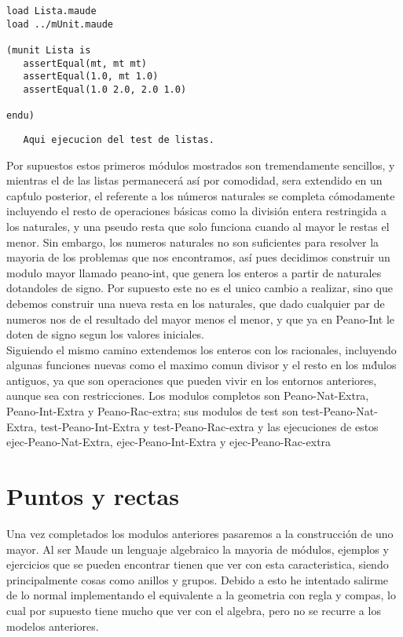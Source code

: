 \begin{verbatim}
load Lista.maude
load ../mUnit.maude

(munit Lista is
   assertEqual(mt, mt mt)
   assertEqual(1.0, mt 1.0)
   assertEqual(1.0 2.0, 2.0 1.0)

endu)

\end{verbatim}

\begin{verbatim}
   Aqui ejecucion del test de listas.
\end{verbatim}

Por supuestos estos primeros m\'odulos mostrados son tremendamente sencillos, y mientras el de las listas permanecer\'a as\'i por comodidad, sera extendido en un cap\'tulo posterior, el referente a los n\'umeros naturales se completa c\'omodamente incluyendo el resto de operaciones b\'asicas como la divisi\'on entera restringida a los naturales, y una pseudo resta que solo funciona cuando al mayor le restas el menor. Sin embargo, los numeros naturales no son suficientes para resolver la mayoria de los problemas que nos encontramos, as\'i pues decidimos construir un modulo mayor llamado peano-int, que genera los enteros a partir de naturales dotandoles de signo. Por supuesto este no es el unico cambio a realizar, sino que debemos construir una nueva resta en los naturales, que dado cualquier par de numeros nos de el resultado del mayor menos el menor, y que ya en Peano-Int le doten de signo segun los valores iniciales. \\

Siguiendo el mismo camino extendemos los enteros con los racionales, incluyendo algunas funciones nuevas como el maximo comun divisor y el resto en los m\'dulos antiguos, ya que son operaciones que pueden vivir en los entornos anteriores, aunque sea con restricciones. Los modulos completos son Peano-Nat-Extra, Peano-Int-Extra y Peano-Rac-extra; sus modulos de test son test-Peano-Nat-Extra, test-Peano-Int-Extra y test-Peano-Rac-extra y las ejecuciones de estos ejec-Peano-Nat-Extra, ejec-Peano-Int-Extra y ejec-Peano-Rac-extra \par

\chapter{Puntos y rectas}\label{cap.2}

Una vez completados los modulos anteriores pasaremos a la construcci\'on de uno mayor. Al ser Maude un lenguaje algebraico la mayoria de m\'odulos, ejemplos y ejercicios que se pueden encontrar tienen que ver con esta caracteristica, siendo principalmente cosas como anillos y grupos. Debido a esto he intentado salirme de lo normal implementando el equivalente a la geometria con regla y compas, lo cual por supuesto tiene mucho que ver con el algebra, pero no se recurre a los modelos anteriores. \\

